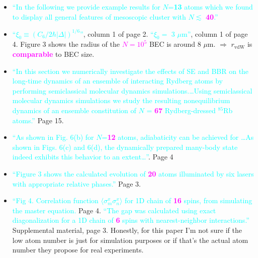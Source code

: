 \documentclass[10pt,twocolumn]{article}
\begin{document}
\begin{itemize}
\item \textbf{\cite{pupillo2010}} \textcolor{Cyan}{``In the following we provide example results for $N$=\textbf{13} atoms which we found to display all general features of mesoscopic cluster with $N\lesssim$ \textcolor{Magenta}{\textbf{40}}.''}
\item \textbf{\cite{honer10a}} \textcolor{Cyan}{``$\xi_0\equiv\left(C_6/2\hbar\left|\Delta\right|\right)^{1/6}$''}, column 1 of page 2. \textcolor{Cyan}{``$\xi_0=$ 3 $\mu$m''}, column 1 of page 4. Figure 3 shows the radius of the \textcolor{Magenta}{$N=10^5$} BEC is around 8 $\mu$m. $\Longrightarrow$ $r_{\text{vdW}}$ is \textcolor{Magenta}{\textbf{comparable}} to BEC size.

\item \textbf{\cite{Glaetzle2012}} \textcolor{Cyan}{``In this section we numerically investigate the effects of SE and BBR on the long-time dynamics of an ensemble of interacting Rydberg atoms by performing semiclassical molecular dynamics simulations.\ldots Using semiclassical molecular dynamics simulations we
study the resulting nonequilibrium dynamics of an ensemble
constitution of $N$ = \textcolor{Magenta}{\textbf{67}} Rydberg-dressed $^{85}$Rb atoms.''} Page 15.

\item \textbf{\cite{vanBijnen2015}} \textcolor{Cyan}{``As shown in Fig. 6(b) for $N$=\textcolor{Magenta}{\textbf{12}} atoms, adiabaticity can be achieved for \ldots As shown in Figs. 6(c) and 6(d), the dynamically prepared many-body state indeed exhibits this behavior to an extent\ldots''}. Page 4

\item \textbf{\cite{Bouchoule2002}} \textcolor{Cyan}{``Figure 3 shows the calculated evolution
of \textcolor{Magenta}{\textbf{20}} atoms illuminated by six lasers with appropriate relative
phases.''} Page 3.

\item \textbf{\cite{Lee2013a}} \textcolor{Cyan}{``Fig 4. Correlation function $\langle\sigma_m^x\sigma_n^x\rangle$ for 1D chain of \textcolor{Magenta}{\textbf{16}} spins, from simulating the master equation.} Page 4. \textcolor{Cyan}{``The gap was calculated using exact diagonalization for a 1D chain of \textcolor{Magenta}{\textbf{6}} spins with nearest-neighbor interactions.''} Supplemental material, page 3. Honestly, for this paper I'm not sure if the low atom number is just for simulation purposes or if that's the actual atom number they propose for real experiments.


\end{itemize}
\end{document}

